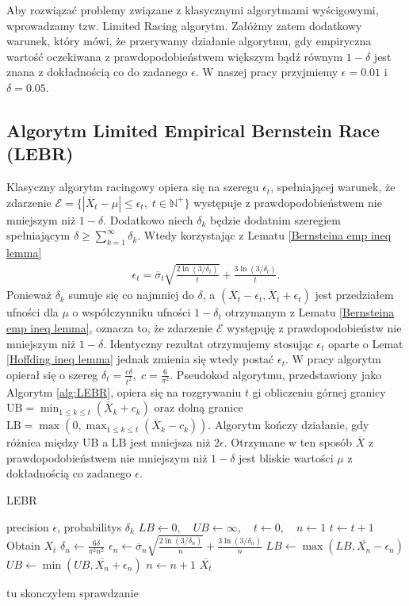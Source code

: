 \documentclass[inzynierska]{pwr_wmat_praca_dyplomowa}
\theoremstyle{plain}
\numberwithin{theorem}{chapter}
\theoremstyle{definition}
\numberwithin{theorem}{chapter}
\begin{document}
	Aby rozwiązać problemy związane z klasycznymi algorytmami wyścigowymi, wprowadzamy tzw. Limited Racing algorytm. Załóżmy zatem dodatkowy warunek, który mówi, że przerywamy działanie algorytmu, gdy empiryczna wartość oczekiwana z prawdopodobieństwem większym bądź równym $1-\delta$ jest znana z dokładnością co do zadanego $\epsilon$. W naszej pracy przyjmiemy $\epsilon=0.01$ i $\delta = 0.05$.
	\subsection{Algorytm Limited Empirical Bernstein Race (LEBR)}
	Klasyczny algorytm racingowy opiera się na szeregu $\epsilon_t$, spełniającej warunek, że zdarzenie $\mathcal{E}= \{|\overline{X}_t - \mu | \le \epsilon_t,\; t\in \mathbb{N}^+\}$ występuje z prawdopodobieństwem nie mniejszym niż $1-\delta$. Dodatkowo niech $\delta_k$ będzie dodatnim szeregiem spełniającym $ \delta \ge \sum_{k = 1}^{\infty}\delta_k$. Wtedy korzystając z Lematu \ref{Bernsteina emp ineq lemma}
	\begin{gather*}
		\label{eq:LEBR epsilon}
		\epsilon_t =  \overline{\sigma}_t \sqrt{\frac{2\ln(3/\delta_t)}{t}} + \frac{3  \ln{(3 / \delta_t)}}{t}.
	\end{gather*}
	Ponieważ $\delta_k$ sumuje się co najmniej do $\delta$, a $(\overline{X}_t - \epsilon_t, \overline{X}_t + \epsilon_t)$ jest przedziałem ufności dla $\mu$ o współczynniku ufności $1-\delta_t$ 
	otrzymanym z Lematu \ref{Bernsteina emp ineq lemma}, oznacza to, że zdarzenie $\mathcal{E}$ występuję z prawdopodobieństw nie mniejszym niż $1-\delta$. Identyczny rezultat otrzymujemy stosując $\epsilon_t$ oparte o Lemat \ref{Hoffding ineq lemma} jednak zmienia się wtedy postać $\epsilon_t$. W pracy \cite{cauwet2018surprising} algorytm opierał się o szereg $\delta_t=\frac{c\delta}{t^2},\; c=\frac{6}{\pi^2}$.
	Pseudokod algorytmu, przedstawiony jako Algorytm \ref{alg:LEBR}, opiera się na rozgrywaniu $t$ gi obliczeniu górnej granicy $\text{UB} = \min_{1\le k\le t}( \overline{X}_k+c_k)$ oraz dolną granice $\text{LB} = \max(0, \max_{1\le k\le t}(\overline{X}_k-c_k))$. Algorytm kończy działanie, gdy różnica między $\text{UB}$ a $\text{LB}$ jest mniejsza niż $2\epsilon$. Otrzymane w ten sposób $\overline{X}$ z prawdopodobieństwem nie mniejszym niż $1 - \delta$ jest bliskie wartości $\mu$ z dokładnością co zadanego $\epsilon$.
	\begin{algorithm}
		\caption{LEBR}\label{alg:LEBR}
		\begin{algorithmic}
			\Ensure precision $\epsilon$, probabilitys $\delta_k$
			\State $LB \gets 0, \quad UB \gets \infty, \quad t \gets 0,\quad n \gets 1$ 
			\State $t \gets t + 1$
			\State Obtain $X_t$
			\State $\delta_n \gets \frac{6\delta}{\pi^2n^2}$					
			\State $\epsilon_n \gets \overline{\sigma}_n \sqrt{\frac{2\ln(3/\delta_n)}{n}} + \frac{3  \ln{(3 / \delta_n)}}{n}$ 
			\State $LB \gets \max(LB,  \overline{X_n} - \epsilon_n)$
			\State $UB \gets \min(UB,  \overline{X_n} + \epsilon_n)$
			\State $n \gets n + 1$
			\EndWhile
			\State \Return $ \overline{X_t}$		
		\end{algorithmic}
	\end{algorithm}
	tu skonczyłem sprawdzanie
\end{document}
